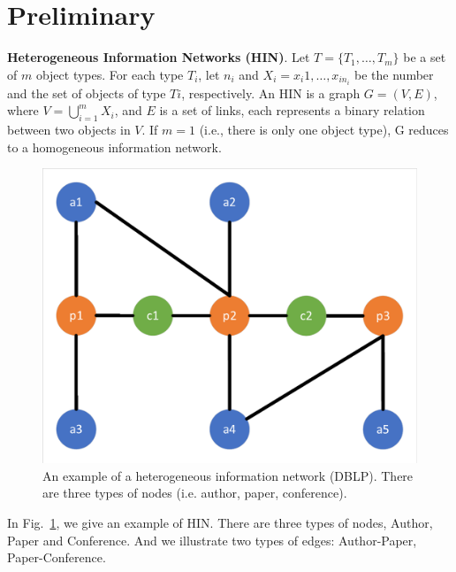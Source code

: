 \section{Preliminary}
\label{sec:pre}

\begin{definition}
\textbf{ Heterogeneous Information Networks (HIN)}\cite{JiSDHG10}. 
Let $T = \{T_1,\ldots, T_m\}$ be a set of $m$ object types.
For each type $T_i$, let $n_i$ and $X_i = {x_i1,\ldots, x_{in_i} }$ be the number and the set of objects of type $Ti$, respectively. An HIN
is a graph $G = (V, E)$, where $V =
\bigcup\limits_{i=1}^{m} X_i$, and $E$ is a set of
links, each represents a binary relation between two objects
in $V$. If $m = 1$ (i.e., there is only one object type), G reduces
to a homogeneous information network. 
\end{definition}

\begin{figure}
    \centering
        \includegraphics[width = 0.7\linewidth]{figure/example1.pdf}
        \caption{An example of a heterogeneous information network (DBLP). There are three types of nodes (i.e. author, paper, conference).}
        \label{figure:example}
\end{figure}

\begin{example}
In Fig.~\ref{figure:example}, we give an example of HIN. There are three types of nodes, Author, Paper and Conference. And we illustrate two types of edges: Author-Paper, Paper-Conference.
\end{example}

